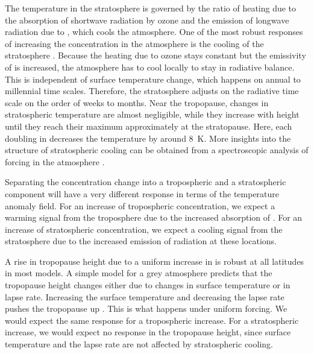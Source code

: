 The temperature in the stratosphere is governed by the ratio of heating due to the absorption of shortwave radiation by ozone and the emission of longwave radiation due to \CO{}, which cools the atmosphere. One of the most robust responses of increasing the \CO{} concentration in the atmosphere is the cooling of the stratosphere \parencite{santerSearchHumanInfluences1996}. Because the heating due to ozone stays constant but the emissivity of \CO{} is increased, the atmosphere has to cool locally to stay in radiative balance. This is independent of surface temperature change, which happens on annual to millennial time scales. Therefore, the stratosphere adjusts on the radiative time scale on the order of weeks to months. Near the tropopause, changes in stratospheric temperature are almost negligible, while they increase with height until they reach their maximum approximately at the stratopause. Here, each doubling in \CO{} decreases the temperature by around \SI{8}{\K}. More insights into the structure of stratospheric cooling can be obtained from a spectroscopic analysis of \CO{} forcing in the atmosphere \parencite{cohenStratosphericCoolingAmplification2026}.


Separating the \CO{} concentration change into a tropospheric and a stratospheric component will have a very different response in terms of the temperature anomaly field. For an increase of tropospheric \CO{} concentration, we expect a warming signal from the troposphere due to the increased absorption of \CO{}. For an increase of stratospheric \CO{} concentration, we expect a cooling signal from the stratosphere due to the increased emission of radiation at these locations. 

A rise in tropopause height due to a uniform increase in \CO{} is robust at all latitudes in most models. A simple model for a grey atmosphere predicts that the tropopause height changes either due to changes in surface temperature or in lapse rate. Increasing the surface temperature and decreasing the lapse rate pushes the tropopause up \parencite{vallisResponseLargescaleStructure2015}. This is what happens under uniform \CO{} forcing. We would expect the same response for a tropospheric \CO{} increase. For a stratospheric \CO{} increase, we would expect no response in the tropopause height, since surface temperature and the lapse rate are not affected by stratospheric cooling.


